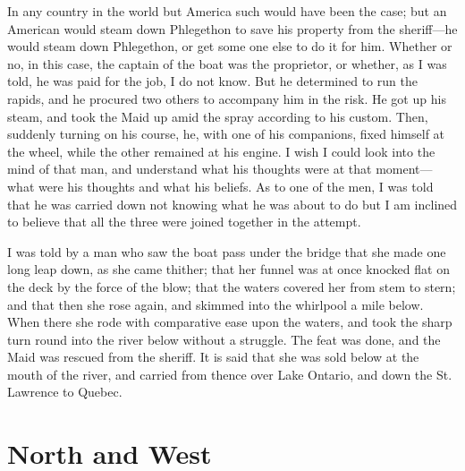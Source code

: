In any country in the world but America such would have been the
case; but an American would steam down Phlegethon to save his
property from the sheriff---he would steam down Phlegethon, or get
some one else to do it for him.  Whether or no, in this case, the
captain of the boat was the proprietor, or whether, as I was told,
he was paid for the job, I do not know.  But he determined to run
the rapids, and he procured two others to accompany him in the
risk.  He got up his steam, and took the Maid up amid the spray
according to his custom.  Then, suddenly turning on his course, he,
with one of his companions, fixed himself at the wheel, while the
other remained at his engine.  I wish I could look into the mind of
that man, and understand what his thoughts were at that moment---%
what were his thoughts and what his beliefs.  As to one of the men,
I was told that he was carried down not knowing what he was about
to do but I am inclined to believe that all the three were joined
together in the attempt.

I was told by a man who saw the boat pass under the bridge that she
made one long leap down, as she came thither; that her funnel was
at once knocked flat on the deck by the force of the blow; that the
waters covered her from stem to stern; and that then she rose
again, and skimmed into the whirlpool a mile below.  When there she
rode with comparative ease upon the waters, and took the sharp turn
round into the river below without a struggle.  The feat was done,
and the Maid was rescued from the sheriff.  It is said that she was
sold below at the mouth of the river, and carried from thence over
Lake Ontario, and down the St. Lawrence to Quebec.



\chapter{North and West}


